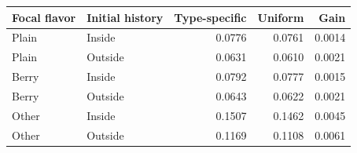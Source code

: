\begin{tabular}{llrrr}\toprule
Focal flavor & Initial history & Type-specific & Uniform & Gain\\\midrule
Plain & Inside & 0.0776 & 0.0761 & 0.0014 \\
Plain & Outside & 0.0631 & 0.0610 & 0.0021 \\
Berry & Inside & 0.0792 & 0.0777 & 0.0015 \\
Berry & Outside & 0.0643 & 0.0622 & 0.0021 \\
Other & Inside & 0.1507 & 0.1462 & 0.0045 \\
Other & Outside & 0.1169 & 0.1108 & 0.0061 \\
\bottomrule\end{tabular}
